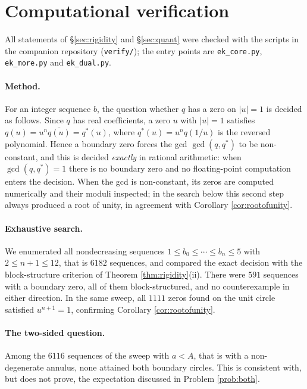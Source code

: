 \documentclass[11pt]{amsart}
\theoremstyle{plain}
\theoremstyle{definition}
\theoremstyle{remark}
\newcommand{\abs}[1]{\lvert #1\rvert}
\begin{document}
\section{Computational verification}\label{sec:numerics}

All statements of \S\ref{sec:rigidity} and \S\ref{sec:quant} were checked with the scripts
in the companion repository (\texttt{verify/}); the entry points are \texttt{ek\_core.py},
\texttt{ek\_more.py} and \texttt{ek\_dual.py}.

\paragraph{Method.} For an integer sequence $b$, the question whether $q$ has a zero on
$\abs{u}=1$ is decided as follows. Since $q$ has real coefficients, a zero $u$ with
$\abs{u}=1$ satisfies $q(u)=u^{n}\overline{q(u)}=q^{*}(u)$, where $q^{*}(u)=u^{n}q(1/u)$ is
the reversed polynomial. Hence a boundary zero forces the gcd $\gcd(q,q^{*})$ to be
non-constant, and this is decided \emph{exactly} in rational arithmetic: when
$\gcd(q,q^{*})=1$ there is no boundary zero and no floating-point computation enters the
decision. When the gcd is non-constant, its zeros are computed numerically and their moduli
inspected; in the search below this second step always produced a root of unity, in
agreement with Corollary \ref{cor:rootofunity}.

\paragraph{Exhaustive search.} We enumerated all nondecreasing sequences
$1\le b_0\le\cdots\le b_n\le5$ with $2\le n+1\le12$, that is $6182$ sequences, and compared
the exact decision with the block-structure criterion of Theorem \ref{thm:rigidity}(ii).
There were $591$ sequences with a boundary zero, all of them block-structured, and no
counterexample in either direction. In the same sweep, all $1111$ zeros found on the unit
circle satisfied $u^{n+1}=1$, confirming Corollary \ref{cor:rootofunity}.

\paragraph{The two-sided question.} Among the $6116$ sequences of the sweep with $a<A$, that
is with a non-degenerate annulus, none attained both boundary circles. This is consistent
with, but does not prove, the expectation discussed in Problem \ref{prob:both}.
\end{document}
